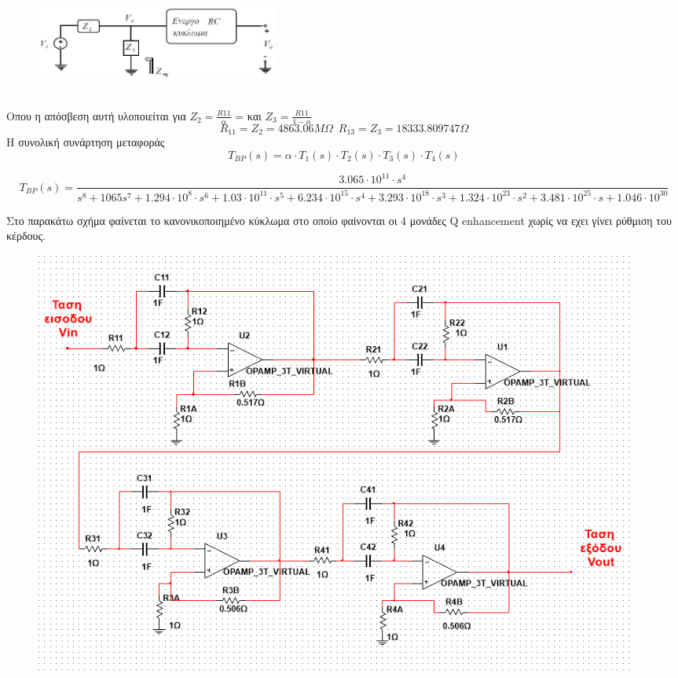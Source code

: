 \documentclass{article}
\begin{document}
{{\begin{figure}[h!]
  \includegraphics[width=80mm,scale=2]{kerdos.png}
\end{figure} \\
Οπου η απόσβεση αυτή υλοποιείται για $Ζ_2 = \frac{R11}{α}$ = και $Ζ_3 = \frac{R11}{1-α}$  
\begin{equation*}
\boxed{R_{11} = Z_2 = 4863.06MΩ} \enspace \boxed{R_{13} = Z_3 = 18333.809747Ω}  
\end{equation*}
Η συνολική συνάρτηση μεταφοράς
\begin{equation*}
T_{BP}(s) = α \cdot T_1(s) \cdot T_2(s) \cdot T_3(s) \cdot T_4(s)
\end{equation*}
\small{}
\begin{changemargin}{-3.5cm}{0.5cm} 
\begin{equation*}
\boxed{
T_{BP} (s) = \frac{3.065 \cdot 10^{11} \cdot s^4}{s^8 + 1065 s^7 + 1.294\cdot10^8 \cdot s^6 + 1.03 \cdot 10^{11} \cdot s^5 + 6.234 \cdot 10^{15} \cdot s^4 + 3.293 \cdot 10^{18} \cdot s^3 + 1.324\cdot 10^{23} \cdot s^2 + 3.481 \cdot 10^{25}\cdot s + 1.046 \cdot 10^{30}
 }
 }
\end{equation*}
\end{changemargin}
\large{}
\newpage
Στο παρακάτω σχήμα φαίνεται το κανονικοποιημένο κύκλωμα στο οποίο φαίνονται οι 4 μονάδες Q enhancement χωρίς να εχει γίνει ρύθμιση του κέρδους.
\begin{figure}[h!]
\centering
 	\advance\leftskip-4cm
  \includegraphics[width=200mm,scale=2]{kanon_bandpass2.png}

\end{figure}}}
\end{document}
